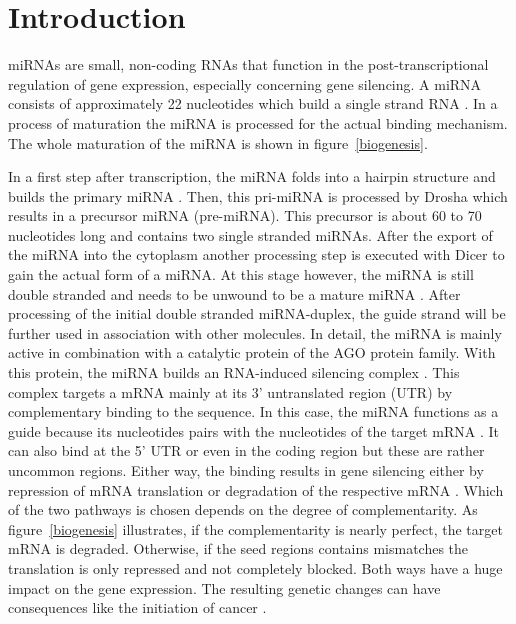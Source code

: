 \documentclass[12pt]{article}
\begin{document}
 
\vspace{1.5cm}


\section{Introduction}

miRNAs are small, non-coding RNAs that function in the post-transcriptional regulation of gene expression, especially concerning gene silencing. A miRNA consists of approximately 22 nucleotides which build a single strand RNA \cite{Bartel}. In a process of maturation the miRNA is processed for the actual binding mechanism. The whole maturation of the miRNA is shown in figure~\ref{biogenesis}.

In a first step after transcription, the miRNA folds into a hairpin structure and builds the primary miRNA \cite{Macfarlane}. Then, this pri-miRNA is processed by Drosha which results in a precursor miRNA (pre-miRNA). This precursor is about 60 to 70 nucleotides long and contains two single stranded miRNAs. After the export of the miRNA into the cytoplasm another processing step is executed with Dicer to gain the actual form of a miRNA. At this stage however, the miRNA is still double stranded and needs to be unwound to be a mature miRNA \cite{Macfarlane}. After processing of the initial double stranded miRNA-duplex, the guide strand will be further used in association with other molecules. In detail, the miRNA is mainly active in combination with a catalytic protein of the AGO protein family. With this protein, the miRNA builds an RNA-induced silencing complex \cite{Ha}. This complex targets a mRNA mainly at its 3' untranslated region (UTR) by complementary binding to the sequence. In this case, the miRNA functions as a guide because its nucleotides pairs with the nucleotides of the target mRNA \cite{Macfarlane}. It can also bind at the 5' UTR or even in the coding region but these are rather uncommon regions. Either way, the binding results in gene silencing either by repression of mRNA translation or degradation of the respective mRNA \cite{Enright}. Which of the two pathways is chosen depends on the degree of complementarity. As figure~\ref{biogenesis} illustrates, if the complementarity is nearly perfect, the target mRNA is degraded. Otherwise, if the seed regions contains mismatches the translation is only repressed and not completely blocked. Both ways have a huge impact on the gene expression. The resulting genetic changes can have consequences like the initiation of cancer \cite{Macfarlane}.\\
\end{document}
